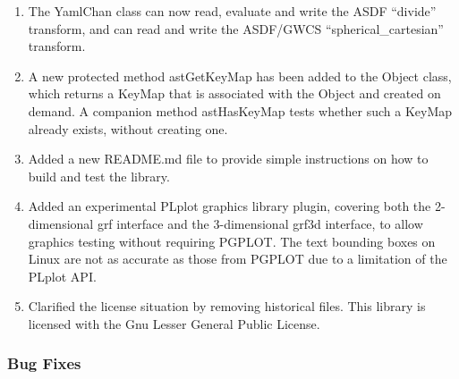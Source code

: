 \documentclass[twoside,11pt]{starlink}
\begin{document}
\begin{enumerate}
\item The YamlChan class can now read, evaluate and write the ASDF ``divide'' transform, and can read and write the ASDF/GWCS ``spherical\_cartesian'' transform.
\item A new protected method astGetKeyMap has been added to the Object class, which returns a KeyMap that is associated with the Object and created on demand.
  A companion method astHasKeyMap tests whether such a KeyMap already exists, without creating one.
\item Added a new README.md file to provide simple instructions on how to build and test the library.
\item Added an experimental PLplot graphics library plugin, covering both the 2-dimensional grf interface and the 3-dimensional grf3d interface, to allow graphics testing without requiring PGPLOT.
  The text bounding boxes on Linux are not as accurate as those from PGPLOT due to a limitation of the PLplot API.
\item Clarified the license situation by removing historical files.
  This library is licensed with the Gnu Lesser General Public License.
\end{enumerate}

\subsubsection{Bug Fixes}
\end{document}

